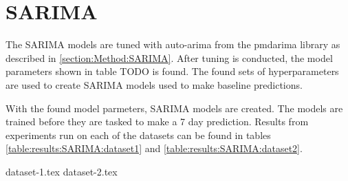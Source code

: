 \section{SARIMA}
\label{section:Results:SARIMA}

The SARIMA models are tuned with auto-arima from the pmdarima library as described in \cref{section:Method:SARIMA}.
After tuning is conducted, the model parameters shown in table TODO is found.
The found sets of hyperparameters are used to create SARIMA models used to make baseline predictions.


With the found model parmeters, SARIMA models are created.
The models are trained before they are tasked to make a 7 day prediction.
Results from experiments run on each of the datasets can be found in tables
\cref{table:results:SARIMA:dataset1} and \cref{table:results:SARIMA:dataset2}.

{dataset-1.tex}
{dataset-2.tex}
